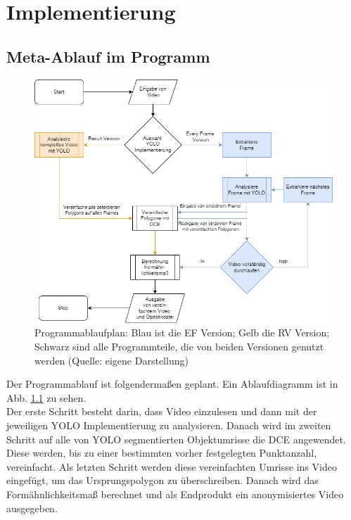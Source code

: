 \chapter{Implementierung} 
\label{ch:implementierung}

	\section{Meta-Ablauf im Programm}{
	\begin{figure}[h]
		\centering
		\includegraphics*[scale = 0.5, keepaspectratio]{images/Ablaufdiagram.png}
		\caption[Programmablaufplan]{Programmablaufplan: Blau ist die EF Version; Gelb die RV Version; Schwarz sind alle Programmteile, die von beiden Versionen genutzt werden (Quelle: eigene Darstellung)}
		\label{pic:Programmablaufplan}
	\end{figure}

	Der Programmablauf ist folgendermaßen geplant. Ein Ablaufdiagramm ist in Abb. \ref{pic:Programmablaufplan} zu sehen. \\  Der erste Schritt besteht darin, dass Video einzulesen und dann mit der jeweiligen YOLO Implementierung zu analysieren. Danach wird im zweiten Schritt auf alle von YOLO segmentierten Objektumrisse die DCE angewendet. Diese werden, bis zu einer bestimmten vorher festgelegten Punktanzahl, vereinfacht. Als letzten Schritt werden diese vereinfachten Umrisse ins Video eingefügt, um das Ursprungspolygon zu überschreiben. Danach wird das Formähnlichkeitsmaß berechnet und als Endprodukt ein anonymisiertes Video ausgegeben. 
	}



